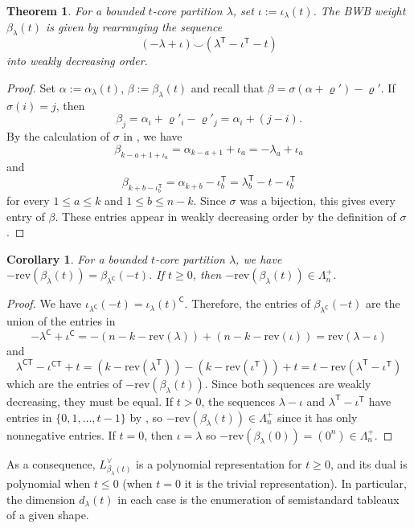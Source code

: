 \documentclass{amsart}
\newcommand\C{\mathsf{C}}
\newcommand\T{\mathsf{T}}
\theoremstyle{plain}
\newtheorem{theorem}{Theorem}[section]
\newtheorem{corollary}[corollary]{Corollary}
\theoremstyle{definition}
\numberwithin{equation}{section}
\begin{document}
\begin{theorem}
For a bounded $t$-core partition $\lambda$, set $\iota:=\iota_\lambda(t)$. The BWB weight $\beta_\lambda(t)$ is given by rearranging the sequence
\[(-\lambda+\iota)\smile(\lambda^\T-\iota^\T-t)\]
into weakly decreasing order.
\end{theorem}
\begin{proof}
Set $\alpha:=\alpha_\lambda(t)$, $\beta:=\beta_\lambda(t)$ and recall that $\beta=\sigma(\alpha+\varrho')-\varrho'$. If $\sigma(i)=j$, then
\[\beta_j=\alpha_i+\varrho'_i-\varrho'_j=\alpha_i+(j-i).\]
By the calculation of $\sigma$ in , we have
\[\beta_{k-a+1+\iota_a}=\alpha_{k-a+1}+\iota_a=-\lambda_a+\iota_a\]
and
\[\beta_{k+b-\iota_b^\T}=\alpha_{k+b}-\iota_b^\T=\lambda_b^\T-t-\iota_b^\T\]
for every $1\leq a\leq k$ and $1\leq b\leq n-k$. Since $\sigma$ was a bijection, this gives every entry of $\beta$. These entries appear in weakly decreasing order by the definition of $\sigma$.
\end{proof}

\begin{corollary}
For a bounded $t$-core partition $\lambda$, we have $-\mathrm{rev}({\beta_\lambda(t)})=\beta_{\lambda^\C}(-t)$. If $t\geq 0$, then $-\mathrm{rev}(\beta_\lambda(t))\in\Lambda_n^+$.
\end{corollary}
\begin{proof}
We have $\iota_{\lambda^\C}(-t)=\iota_\lambda(t)^\C$. Therefore, the entries of $\beta_{\lambda^\C}(-t)$ are the union of the entries in
\[-\lambda^\C+\iota^\C=-(n-k-\mathrm{rev}(\lambda))+(n-k-\mathrm{rev}(\iota))=\mathrm{rev}(\lambda-\iota)\]
and
\[\lambda^{\C\T}-\iota^{\C\T}+t=(k-\mathrm{rev}(\lambda^\T))-(k-\mathrm{rev}(\iota^\T))+t=t-\mathrm{rev}(\lambda^\T-\iota^\T)\]
which are the entries of $-\mathrm{rev}(\beta_\lambda(t))$. Since both sequences are weakly decreasing, they must be equal. If $t>0$, the sequences $\lambda-\iota$ and $\lambda^\T-\iota^\T$ have entries in $\{0,1,\dots,t-1\}$ by , so $-\mathrm{rev}(\beta_\lambda(t))\in\Lambda_n^+$ since it has only nonnegative entries. If $t=0$, then $\iota=\lambda$ so $-\mathrm{rev}(\beta_\lambda(0))=(0^n)\in\Lambda_n^+$.
\end{proof}

As a consequence, $L_{\beta_\lambda(t)}^\vee$ is a polynomial representation for $t\geq 0$, and its dual is polynomial when $t\leq 0$ (when $t=0$ it is the trivial representation). In particular, the dimension $d_\lambda(t)$ in each case is the enumeration of semistandard tableaux of a given shape.
\end{document}
